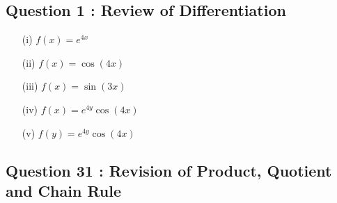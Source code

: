 \documentclass[]{article}
\begin{document}
\subsection*{Question 1 : Review of Differentiation}
\begin{multicols}{2}
\begin{itemize}
\item[(i)] $f(x) = e^{4x}$
\item[(ii)] $f(x) = \cos(4x)$
\item[(iii)] $f(x) = \sin(3x)$
\item[(iv)] $f(x) = e^{4y} \cos(4x)$
\item[(v)] $f(y) = e^{4y} \cos(4x)$
\end{itemize}
\end{multicols}
\subsection*{Question 31 : Revision of Product, Quotient and Chain Rule}
\end{document}
